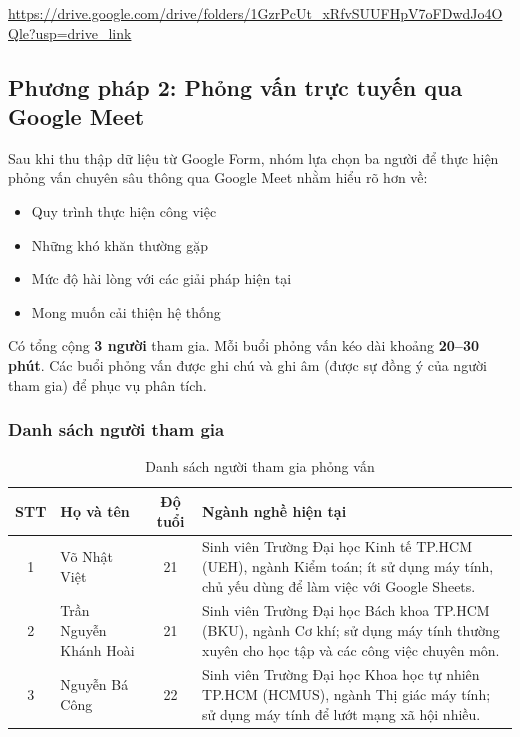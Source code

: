 \documentclass[a4paper,12pt]{article}
\begin{document}
\url{https://drive.google.com/drive/folders/1GzrPcUt_xRfvSUUFHpV7oFDwdJo4OQle?usp=drive_link}

\vspace{5cm}

\newpage

\subsection{Phương pháp 2: Phỏng vấn trực tuyến qua Google Meet}

Sau khi thu thập dữ liệu từ Google Form, nhóm lựa chọn ba người để thực hiện phỏng vấn chuyên sâu thông qua Google Meet nhằm hiểu rõ hơn về:

\begin{itemize}
    \item Quy trình thực hiện công việc
    \item Những khó khăn thường gặp
    \item Mức độ hài lòng với các giải pháp hiện tại
    \item Mong muốn cải thiện hệ thống
\end{itemize}

Có tổng cộng \textbf{3 người} tham gia. Mỗi buổi phỏng vấn kéo dài khoảng \textbf{20--30 phút}. Các buổi phỏng vấn được ghi chú và ghi âm (được sự đồng ý của người tham gia) để phục vụ phân tích.

\subsubsection*{Danh sách người tham gia}

\begin{table}[H]
\centering
\begin{tabular}{|c|p{4cm}|c|p{7cm}|}
\hline
\textbf{STT} & \textbf{Họ và tên} & \textbf{Độ tuổi} & \textbf{Ngành nghề hiện tại} \\
\hline
1 & Võ Nhật Việt & 21 & Sinh viên Trường Đại học Kinh tế TP.HCM (UEH), ngành Kiểm toán; ít sử dụng máy tính, chủ yếu dùng để làm việc với Google Sheets. \\
\hline
2 & Trần Nguyễn Khánh Hoài & 21 & Sinh viên Trường Đại học Bách khoa TP.HCM (BKU), ngành Cơ khí; sử dụng máy tính thường xuyên cho học tập và các công việc chuyên môn. \\
\hline
3 & Nguyễn Bá Công & 22 & Sinh viên Trường Đại học Khoa học tự nhiên TP.HCM (HCMUS), ngành Thị giác máy tính; sử dụng máy tính để lướt mạng xã hội nhiều. \\
\hline
\end{tabular}
\caption{Danh sách người tham gia phỏng vấn}
\end{table}
\vspace{0.5cm}
\end{document}
